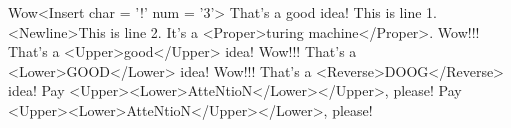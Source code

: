 Wow<Insert char = '!' num = '3'> That's a good idea!
This is line 1.<Newline>This is line 2.
It's a <Proper>turing machine</Proper>.
Wow!!! That's a <Upper>good</Upper> idea!
Wow!!! That's a <Lower>GOOD</Lower> idea!
Wow!!! That's a <Reverse>DOOG</Reverse> idea!
Pay <Upper><Lower>AtteNtioN</Lower></Upper>, please!
Pay <Upper><Lower>AtteNtioN</Upper></Lower>, please!
